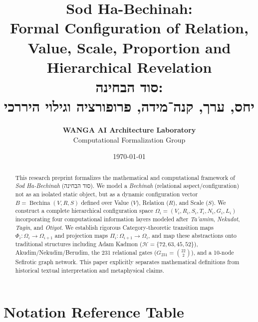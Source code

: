 \documentclass[11pt,a4paper,titlepage]{article}
\title{
    \Huge \textbf{Sod Ha-Bechinah:}\\
    \Large Formal Configuration of Relation, Value, Scale, Proportion and Hierarchical Revelation\\[0.5em]
    \large \textbf{סוד הבחינה:}\\
    \large יחס, ערך, קנה־מידה, פרופורציה וגילוי היררכי
}
\author{
    \textbf{WANGA AI Architecture Laboratory}\\
    \small Computational Formalization Group
}
\date{\today}
\theoremstyle{definition}
\theoremstyle{remark}
\begin{document}
\maketitle

\begin{abstract}
This research preprint formalizes the mathematical and computational framework of \emph{Sod Ha-Bechinah} (סוד הבחינה). We model a \emph{Bechinah} (relational aspect/configuration) not as an isolated static object, but as a dynamic configuration vector $B = \operatorname{Bechina}(V,R,S)$ defined over Value ($V$), Relation ($R$), and Scale ($S$). We construct a complete hierarchical configuration space $\Omega_i = (V_i, R_i, S_i, T_i, N_i, G_i, L_i)$ incorporating four computational information layers modeled after \emph{Ta'amim}, \emph{Nekudot}, \emph{Tagin}, and \emph{Otiyot}. We establish rigorous Category-theoretic transition maps $\Phi_i: \Omega_i \to \Omega_{i+1}$ and projection maps $\Pi_i: \Omega_{i+1} \to \Omega_i$, and map these abstractions onto traditional structures including Adam Kadmon ($\mathcal{H} = \{72, 63, 45, 52\}$), Akudim/Nekudim/Berudim, the 231 relational gates ($G_{231} = \binom{22}{2}$), and a 10-node Sefirotic graph network. This paper explicitly separates mathematical definitions from historical textual interpretation and metaphysical claims.
\end{abstract}

\tableofcontents
\newpage

\section*{Notation Reference Table}
\end{document}

